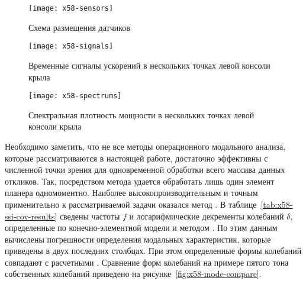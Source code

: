 \begin{figure}[!htb]
	\centerfloat
	\texttt{[image: x58-sensors]}
	\caption{Схема размещения датчиков} \label{fig:x58-sensors}
\end{figure}

\begin{figure}[!htb]
	\centerfloat
	\texttt{[image: x58-signals]}
	\caption{Временные сигналы ускорений в нескольких точках левой консоли крыла} \label{fig:x58-signals}
\end{figure}

\begin{figure}[!htb]
	\centerfloat
	\texttt{[image: x58-spectrums]}
	\caption{Спектральная плотность мощности в нескольких точках левой консоли крыла} \label{fig:x58-spectrums}
\end{figure}

Необходимо заметить, что не все методы операционного модального анализа, которые рассматриваются в настоящей работе, достаточно эффективны с численной точки зрения для одновременной обработки всего массива данных откликов. Так, посредством метода  удается обработать лишь один элемент планера одномоментно. Наиболее высокопроизводительным и точным применительно к рассматриваемой задачи оказался метод . В таблице~\ref{tab:x58-ssi-cov-results} сведены частоты $ f $ и логарифмические декременты колебаний $ \delta $, определенные по конечно-элементной модели и методом . По этим данным вычислены погрешности определения модальных характеристик, которые приведены в двух последних столбцах. При этом определенные формы колебаний  совпадают с расчетными . Сравнение форм колебаний на примере пятого тона собственных колебаний приведено на рисунке~\ref{fig:x58-mode-compare}. 

